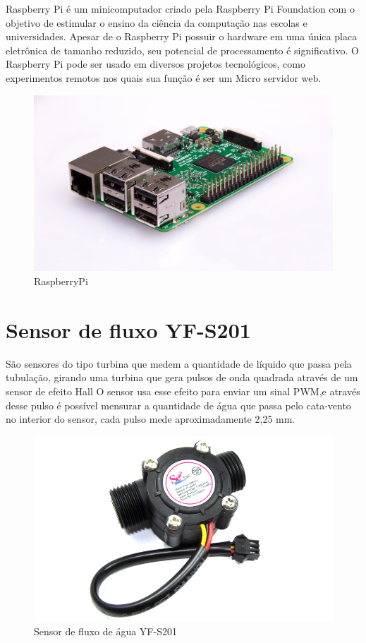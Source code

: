 Raspberry Pi é um minicomputador criado pela
Raspberry Pi Foundation com o objetivo de estimular o
ensino da ciência da computação nas escolas e
universidades. Apesar de o Raspberry Pi possuir o
hardware em uma única placa eletrônica de tamanho
reduzido, seu potencial de processamento é significativo.
O Raspberry Pi pode ser usado em diversos projetos
tecnológicos, como experimentos remotos nos quais sua
função é ser um Micro servidor web.\cite{crotti2013raspberrypi}

\begin{figure}[htbp]
		\centering
		\includegraphics[scale=0.2]{figuras/raspberrypi.jpg}
		\caption{RaspberryPi}
		\label{fig:09}
\end{figure}

\section{Sensor de fluxo YF-S201}

São sensores do tipo turbina que medem a quantidade de líquido que passa pela tubulação, girando uma turbina que
gera pulsos de onda quadrada através de um sensor de efeito Hall\cite{roque2018sistema} O
sensor usa esse efeito para enviar um sinal PWM,e através desse pulso é possível mensurar a quantidade de água que passa pelo cata-vento no interior do sensor, cada pulso mede aproximadamente 2,25 mm.\cite{ms2017automaccao}

\begin{figure}[htbp]
		\centering
		\includegraphics[scale=0.3]{figuras/yf-s201.jpg}
		\caption{Sensor de fluxo de água YF-S201}
		\label{sensor}
\end{figure}